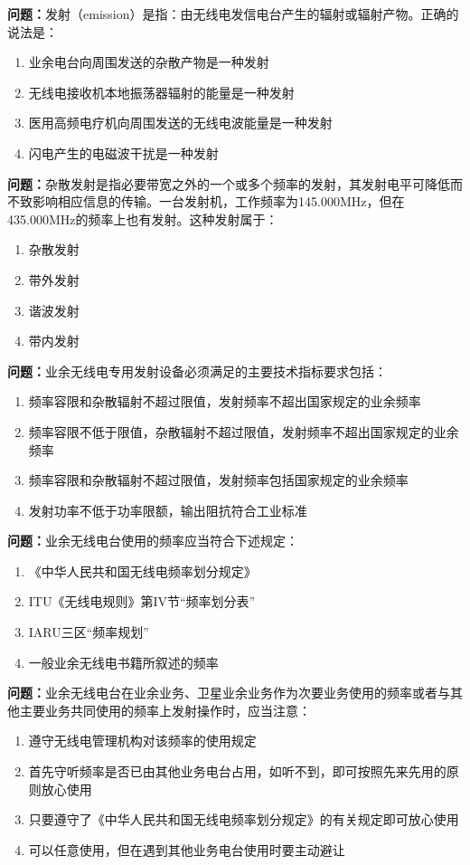 \textbf{问题：}发射（emission）是指：由无线电发信电台产生的辐射或辐射产物。正确的说法是：
\begin{enumerate}[label=\Alph*), leftmargin=1cm]
	\item 业余电台向周围发送的杂散产物是一种发射
	\item 无线电接收机本地振荡器辐射的能量是一种发射
	\item 医用高频电疗机向周围发送的无线电波能量是一种发射
	\item 闪电产生的电磁波干扰是一种发射
\end{enumerate}

\textbf{问题：}杂散发射是指必要带宽之外的一个或多个频率的发射，其发射电平可降低而不致影响相应信息的传输。一台发射机，工作频率为145.000MHz，但在435.000MHz的频率上也有发射。这种发射属于：
\begin{enumerate}[label=\Alph*), leftmargin=1cm]
	\item 杂散发射
	\item 带外发射
	\item 谐波发射
	\item 带内发射
\end{enumerate}

\textbf{问题：}业余无线电专用发射设备必须满足的主要技术指标要求包括：
\begin{enumerate}[label=\Alph*), leftmargin=1cm]
	\item 频率容限和杂散辐射不超过限值，发射频率不超出国家规定的业余频率
	\item 频率容限不低于限值，杂散辐射不超过限值，发射频率不超出国家规定的业余频率
	\item 频率容限和杂散辐射不超过限值，发射频率包括国家规定的业余频率
	\item 发射功率不低于功率限额，输出阻抗符合工业标准
\end{enumerate}

\textbf{问题：}业余无线电台使用的频率应当符合下述规定：
\begin{enumerate}[label=\Alph*), leftmargin=1cm]
	\item 《中华人民共和国无线电频率划分规定》
	\item ITU《无线电规则》第IV节“频率划分表”
	\item IARU三区“频率规划”
	\item 一般业余无线电书籍所叙述的频率
\end{enumerate}

\textbf{问题：}业余无线电台在业余业务、卫星业余业务作为次要业务使用的频率或者与其他主要业务共同使用的频率上发射操作时，应当注意：
\begin{enumerate}[label=\Alph*), leftmargin=1cm]
	\item 遵守无线电管理机构对该频率的使用规定
	\item 首先守听频率是否已由其他业务电台占用，如听不到，即可按照先来先用的原则放心使用
	\item 只要遵守了《中华人民共和国无线电频率划分规定》的有关规定即可放心使用
	\item 可以任意使用，但在遇到其他业务电台使用时要主动避让
\end{enumerate}


